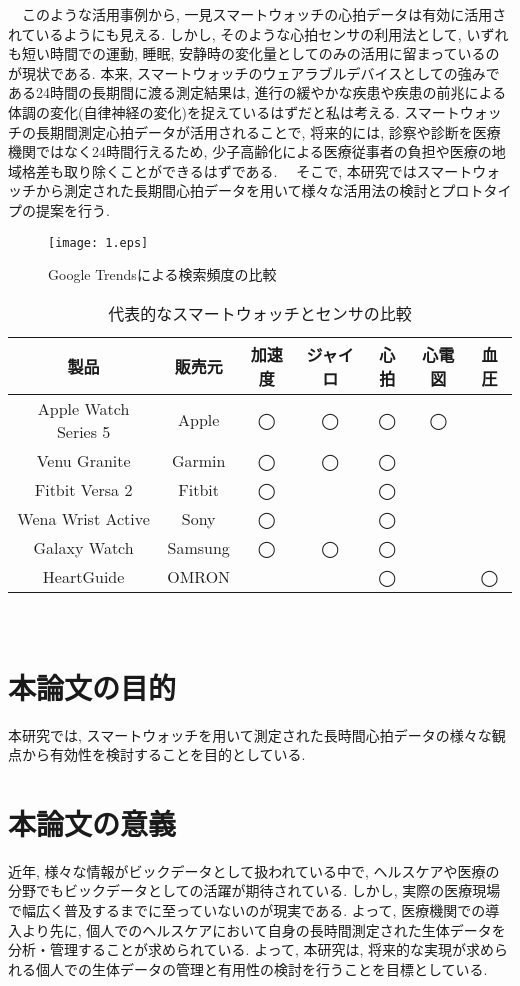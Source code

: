 \documentclass[report, 11pt, a4paper]{jsbook}
\begin{document}
　このような活用事例から, 一見スマートウォッチの心拍データは有効に活用されているようにも見える. しかし, そのような心拍センサの利用法として, いずれも短い時間での運動, 睡眠, 安静時の変化量としてのみの活用に留まっているのが現状である. 本来, スマートウォッチのウェアラブルデバイスとしての強みである24時間の長期間に渡る測定結果は, 進行の緩やかな疾患や疾患の前兆による体調の変化(自律神経の変化)を捉えているはずだと私は考える. スマートウォッチの長期間測定心拍データが活用されることで, 将来的には, 診察や診断を医療機関ではなく24時間行えるため, 少子高齢化による医療従事者の負担や医療の地域格差も取り除くことができるはずである.
　そこで, 本研究ではスマートウォッチから測定された長期間心拍データを用いて様々な活用法の検討とプロトタイプの提案を行う.  

\begin{figure}[h]
\centering
\texttt{[image: 1.eps]}
\caption{Google Trendsによる検索頻度の比較}
\label{fig:goolge_trends}
\end{figure}


\begin{table}[H]
\centering
\caption{代表的なスマートウォッチとセンサの比較}
\begin{tabular}{ccccccc}
\hline
製品                   & 販売元     & 加速度 & ジャイロ & 心拍 & 心電図 & 血圧 \\ \hline
Apple Watch Series 5 & Apple   & ◯   & ◯    & ◯  & ◯   &    \\
Venu Granite         & Garmin  & ◯   & ◯    & ◯  &     &    \\
Fitbit Versa 2       & Fitbit  & ◯   &      & ◯  &     &    \\
Wena Wrist Active    & Sony    & ◯   &      & ◯  &     &    \\
Galaxy Watch         & Samsung & ◯   & ◯    & ◯  &     &    \\
HeartGuide           & OMRON   &     &      & ◯  &     & ◯  \\ \hline
\end{tabular}
\end{table}
　
\section{本論文の目的}
本研究では, スマートウォッチを用いて測定された長時間心拍データの様々な観点から有効性を検討することを目的としている. 

\section{本論文の意義}
近年, 様々な情報がビックデータとして扱われている中で, ヘルスケアや医療の分野でもビックデータとしての活躍が期待されている. しかし, 実際の医療現場で幅広く普及するまでに至っていないのが現実である. よって, 医療機関での導入より先に, 個人でのヘルスケアにおいて自身の長時間測定された生体データを分析・管理することが求められている.  
よって, 本研究は, 将来的な実現が求められる個人での生体データの管理と有用性の検討を行うことを目標としている. 
\end{document}
